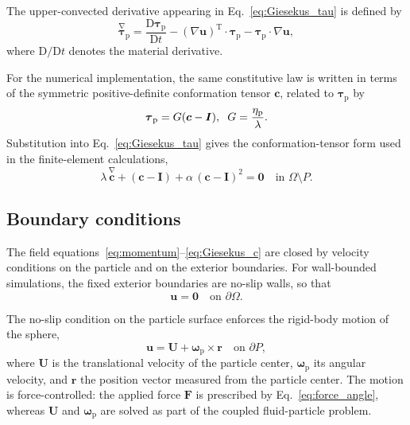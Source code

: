 \documentclass{elsarticle}
\renewcommand{\vec}[1]{\boldsymbol{#1}}
\newcommand{\ten}[1]{\boldsymbol{#1}}
\begin{document}
The upper-convected derivative appearing in
Eq.~\eqref{eq:Giesekus_tau} is defined by
\begin{equation}
\overset{\nabla}{\ten{\tau}}_{\mathrm{p}}
= \frac{\mathrm{D}\ten{\tau}_{\mathrm{p}}}{\mathrm{D}t}
  - (\nabla\vec{u})^{\mathrm{T}}\cdot\ten{\tau}_{\mathrm{p}}
  - \ten{\tau}_{\mathrm{p}}\cdot\nabla\vec{u},
\label{eq:ucd}
\end{equation}
where $\mathrm{D}/\mathrm{D}t$ denotes the material derivative.

For the numerical implementation, the same constitutive law is written
in terms of the symmetric positive-definite conformation tensor
$\ten{c}$, related to $\ten{\tau}_{\mathrm{p}}$ by
\begin{equation}
\ten{\tau}_{\mathrm{p}}
= G(\ten{c} - \ten{I}),  \hspace{0.2cm} G = \frac{\eta_{\mathrm{p}}}{\lambda}.
\label{eq:tau_c}
\end{equation}
Substitution into Eq.~\eqref{eq:Giesekus_tau} gives the
conformation-tensor form used in the finite-element calculations,
\begin{equation}
\lambda\,\overset{\nabla}{\ten{c}}
+ (\ten{c} - \ten{I})
+ \alpha\,(\ten{c} - \ten{I})^2
= \ten{0}
\quad \text{in } \Omega \setminus P.
\label{eq:Giesekus_c}
\end{equation}

\subsection{Boundary conditions}

The field equations~\eqref{eq:momentum}--\eqref{eq:Giesekus_c} are
closed by velocity conditions on the particle and on the exterior
boundaries. For wall-bounded simulations, the fixed exterior
boundaries are no-slip walls, so that
\begin{equation}
\vec{u} = \vec{0} \quad \text{on } \partial\Omega.
\label{eq:no_slip_walls}
\end{equation}

The no-slip condition on the particle surface enforces the rigid-body
motion of the sphere,
\begin{equation}
\vec{u} = \vec{U} + \vec{\omega}_{\mathrm{p}} \times \vec{r}
\quad \text{on } \partial P,
\label{eq:no_slip_particle}
\end{equation}
where $\vec{U}$ is the translational velocity of the particle center,
$\vec{\omega}_{\mathrm{p}}$ its angular velocity, and $\vec{r}$ the
position vector measured from the particle center. The motion is
force-controlled: the applied force $\vec{F}$ is prescribed by
Eq.~\eqref{eq:force_angle}, whereas $\vec{U}$ and
$\vec{\omega}_{\mathrm{p}}$ are solved as part of the coupled
fluid-particle problem.
\end{document}

